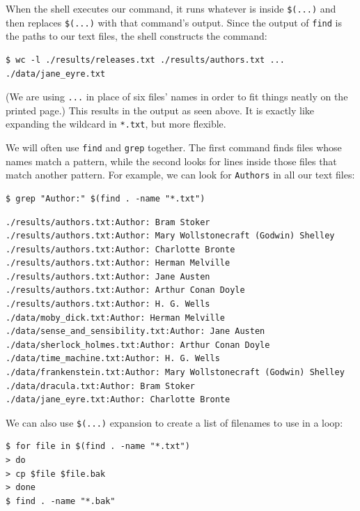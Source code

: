 \documentclass[
]{krantz}
\begin{document}
When the shell executes our command,
it runs whatever is inside \texttt{\$(...)}
and then replaces \texttt{\$(...)} with that command's output.
Since the output of \texttt{find} is the paths to our text files,
the shell constructs the command:

\begin{verbatim}
$ wc -l ./results/releases.txt ./results/authors.txt ... ./data/jane_eyre.txt
\end{verbatim}

(We are using \texttt{...} in place of six files' names in order to fit things neatly on the printed page.)
This results in the output as seen above.
It is exactly like expanding the wildcard in \texttt{*.txt},
but more flexible.

We will often use \texttt{find} and \texttt{grep} together.
The first command finds files whose names match a pattern,
while the second looks for lines inside those files that match another pattern.
For example,
we can look for \texttt{Authors} in all our text files:

\begin{verbatim}
$ grep "Author:" $(find . -name "*.txt")
\end{verbatim}

\begin{verbatim}
./results/authors.txt:Author: Bram Stoker
./results/authors.txt:Author: Mary Wollstonecraft (Godwin) Shelley
./results/authors.txt:Author: Charlotte Bronte
./results/authors.txt:Author: Herman Melville
./results/authors.txt:Author: Jane Austen
./results/authors.txt:Author: Arthur Conan Doyle
./results/authors.txt:Author: H. G. Wells
./data/moby_dick.txt:Author: Herman Melville
./data/sense_and_sensibility.txt:Author: Jane Austen
./data/sherlock_holmes.txt:Author: Arthur Conan Doyle
./data/time_machine.txt:Author: H. G. Wells
./data/frankenstein.txt:Author: Mary Wollstonecraft (Godwin) Shelley
./data/dracula.txt:Author: Bram Stoker
./data/jane_eyre.txt:Author: Charlotte Bronte
\end{verbatim}

We can also use \texttt{\$(...)} expansion to create a list of filenames to use in a loop:

\begin{verbatim}
$ for file in $(find . -name "*.txt")
> do
> cp $file $file.bak
> done
$ find . -name "*.bak"
\end{verbatim}
\end{document}
